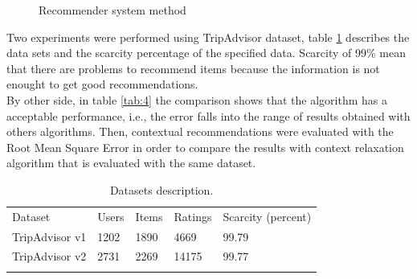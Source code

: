 \begin{figure}
\captionsetup{font=footnotesize}
\captionsetup{justification=centering,margin=2cm}
\centering
{}
\caption{Recommender system method}
\label{fig:architecture}   
\end{figure}
Two experiments were performed using TripAdvisor dataset, table
\ref{tab:3} describes the data sets and the scarcity percentage of the
specified data. Scarcity of 99\% mean that there are problems to
recommend items because the information is not enought to get 
good recommendations.\\  By other side, in table \ref{tab:4} the comparison
shows that the algorithm has a acceptable performance, i.e., the error
falls into the range of results obtained with others algorithms. Then,
contextual recommendations were evaluated with the Root Mean Square
Error in order to compare the results with context relaxation
algorithm\cite{zheng2012differential} that is evaluated with the same
dataset.
\begin{table}
\centering
\small
\captionsetup{font=footnotesize}
\caption{Datasets description.}
\label{tab:3}      
\begin{tabular}{lllll}
\hline\noalign{\smallskip}
Dataset & Users & Items & Ratings & Scarcity (percent) \\
\noalign{\smallskip}\hline\noalign{\smallskip}
TripAdvisor v1 & 1202 & 1890 & 4669 & 99.79 \\
TripAdvisor v2 & 2731 & 2269 & 14175 & 99.77 \\
\noalign{\smallskip}\hline
\end{tabular}
\end{table}

